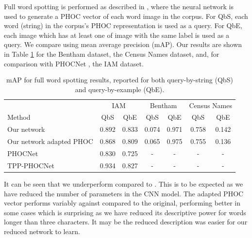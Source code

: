 \documentclass[ms,electronic,twosidetoc,letterpaper,chaptercenter,parttop,lof,lot]{byumsphd}
\begin{document}
Full word spotting is performed as described in \cite{sudholt2016}, where the neural network is used to generate a PHOC vector of each word image in the corpus. For QbS, each word (string) in the corpus's PHOC representation is used as a query. For QbE, each image which has at least one of image with the same label is used as a query. We compare using mean average precision (mAP). Our results are shown in Table \ref{tab:wordspottingresults} for the Bentham dataset, the Census Names dataset, and, for comparison with PHOCNet \cite{sudholt2016,sudholt2017}, the IAM dataset.

\begin{table}
\centering
\begin{tabular}{| l | c  c | c c | c c |}
  \hline
   & \multicolumn{2}{c|}{IAM} & \multicolumn{2}{c|}{Bentham} & \multicolumn{2}{c|}{Census Names}\\
  Method & QbS & QbE & QbS & QbE & QbS & QbE\\
  \hline		
  Our network  &  0.892 & 0.833  &  0.074 & 0.971  &  0.758 & 0.142  \\%
  Our network adapted PHOC  &  0.868 & 0.809  &  0.065 & 0.975  &  0.755 & 0.136 \\
  
  PHOCNet\cite{sudholt2016} & 0.830 & 0.725 & - & - & - & - \\
  TPP-PHOCNet\cite{sudholt2017} & 0.934 & 0.827 & - & - & - & - \\
  \hline  
\end{tabular}
\caption{mAP for full word spotting results, reported for both query-by-string (QbS) and query-by-example (QbE).}
\label{tab:wordspottingresults}
\end{table}

It can be seen that we underperform compared to \cite{sudholt2017}. This is to be expected as we have reduced the number of parameters in the  	CNN model. The adapted PHOC vector performs variably against compared to the original,  performing better in some cases which is surprising as we have reduced its descriptive power for words longer than three characters. It may be the reduced description was easier for our reduced network to learn.
\end{document}
